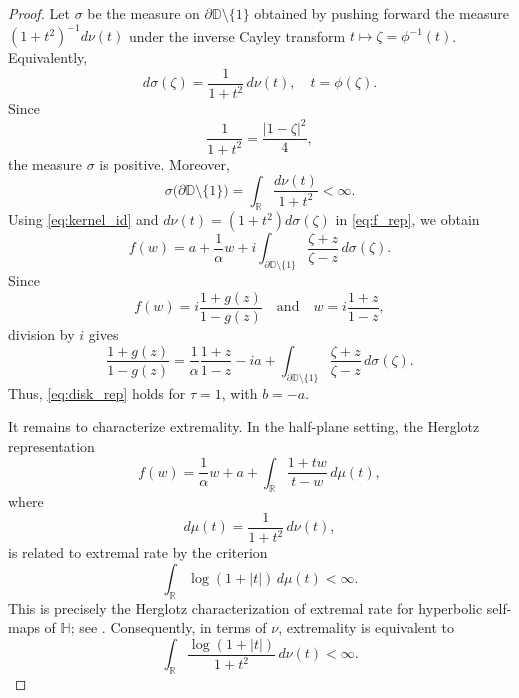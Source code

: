 \documentclass[10pt,a4paper]{amsart}
\numberwithin{equation}{section}
\begin{document}
\begin{proof}
Let $\sigma$ be the measure on
$\partial\mathbb{D}\setminus\{1\}$ obtained by pushing forward the
measure $(1+t^2)^{-1}d\nu(t)$ under the inverse Cayley transform
$t\mapsto\zeta=\phi^{-1}(t)$. Equivalently,
\begin{equation}
\label{eq:sigma_definition}
d\sigma(\zeta)
=
\frac{1}{1+t^2}\,d\nu(t),
\quad
t=\phi(\zeta).
\end{equation}
Since
\begin{equation*}
\frac{1}{1+t^2}
=
\frac{|1-\zeta|^2}{4},
\end{equation*}
the measure $\sigma$ is positive. Moreover,
\begin{equation*}
\sigma\bigl(\partial\mathbb{D}\setminus\{1\}\bigr)
=
\int_{\mathbb{R}}\frac{d\nu(t)}{1+t^2}
<\infty.
\end{equation*}
Using \eqref{eq:kernel_id} and
$d\nu(t)=(1+t^2)d\sigma(\zeta)$ in \eqref{eq:f_rep}, we obtain
\begin{equation*}
f(w)
=
a+\frac{1}{\alpha}w
+i\int_{\partial\mathbb{D}\setminus\{1\}}
\frac{\zeta+z}{\zeta-z}\,d\sigma(\zeta).
\end{equation*}
Since
\begin{equation*}
f(w)=i\frac{1+g(z)}{1-g(z)}
\quad\text{and}\quad
w=i\frac{1+z}{1-z},
\end{equation*}
division by $i$ gives
\begin{equation*}
\label{eq:g_rep_tau1}
\frac{1+g(z)}{1-g(z)}
=
\frac{1}{\alpha}\frac{1+z}{1-z}
-ia
+\int_{\partial\mathbb{D}\setminus\{1\}}
\frac{\zeta+z}{\zeta-z}\,d\sigma(\zeta).
\end{equation*}
Thus, \eqref{eq:disk_rep} holds for $\tau=1$, with $b=-a$.

It remains to characterize extremality. In the half-plane setting,
the Herglotz representation
\begin{equation*}
f(w)
=
\frac{1}{\alpha}w+a
+
\int_{\mathbb{R}}
\frac{1+tw}{t-w}\,d\mu(t),
\end{equation*}
where
\begin{equation*}
d\mu(t)=\frac{1}{1+t^2}\,d\nu(t),
\end{equation*}
is related to extremal rate by the criterion
\begin{equation*}
\int_{\mathbb{R}}\log(1+|t|)\,d\mu(t)<\infty.
\end{equation*}
This is precisely the Herglotz characterization of extremal rate for
hyperbolic self-maps of $\mathbb{H}$; see
\cite[Theorem~4.4]{cruz}.
Consequently, in terms of $\nu$, extremality is equivalent to
\begin{equation}
\label{eq:half_plane_cond}
\int_{\mathbb{R}}
\frac{\log(1+|t|)}{1+t^2}\,d\nu(t)
<\infty.
\end{equation}


\end{proof}
\end{document}
